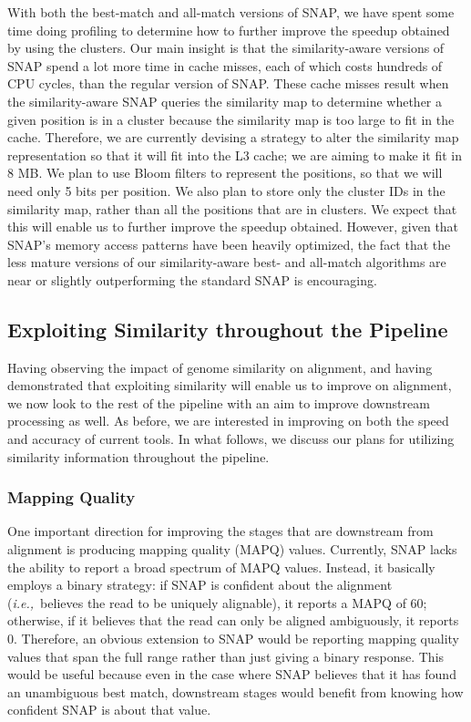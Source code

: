 \documentclass[twocolumn,10pt]{article}
\newcommand{\ie}{{\em i.e.,}~}
\begin{document}
With both the best-match and all-match versions of SNAP, we have spent some time doing profiling to determine how to further improve the speedup obtained by using the clusters.  Our main insight is that the similarity-aware versions of SNAP spend a lot more time in cache misses, each of which costs hundreds of CPU cycles, than the regular version of SNAP.  These cache misses result when the similarity-aware SNAP queries the similarity map to determine whether a given position is in a cluster because the similarity map is too large to fit in the cache.  Therefore, we are currently devising a strategy to alter the similarity map representation so that it will fit into the L3 cache; we are aiming to make it fit in 8 MB.  We plan to use Bloom filters to represent the positions, so that we will need only 5 bits per position.  We also plan to store only the cluster IDs in the similarity map, rather than all the positions that are in clusters.  We expect that this will enable us to further improve the speedup obtained.  However, given that SNAP's memory access patterns have been heavily optimized, the fact that the less mature versions of our similarity-aware best- and all-match algorithms are near or slightly outperforming the standard SNAP is encouraging.  %

\subsection{Exploiting Similarity throughout the Pipeline}

Having observing the impact of genome similarity on alignment, and having demonstrated that exploiting similarity will enable us to improve on alignment, we now look to the rest of the pipeline with an aim to improve downstream processing as well.  As before, we are interested in improving on both the speed and accuracy of current tools.  In what follows, we discuss our plans for utilizing similarity information throughout the pipeline.

\subsubsection{Mapping Quality}

One important direction for improving the stages that are downstream from alignment is producing mapping quality (MAPQ) values.  Currently, SNAP lacks the ability to report a broad spectrum of MAPQ values.  Instead, it basically employs a binary strategy:  if SNAP is confident about the alignment (\ie believes the read to be uniquely alignable), it reports a MAPQ of 60; otherwise, if it believes that the read can only be aligned ambiguously, it reports 0.  Therefore, an obvious extension to SNAP would be reporting mapping quality values that span the full range rather than just giving a binary response.  This would be useful because even in the case where SNAP believes that it has found an unambiguous best match, downstream stages would benefit from knowing how confident SNAP is about that value.
\end{document}
